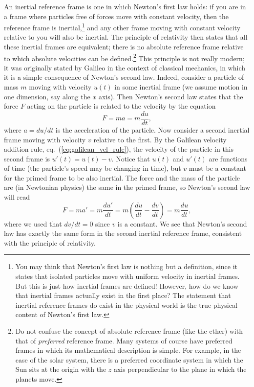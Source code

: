 An inertial reference frame is one in which Newton's first law holds: if you are in a frame where particles free of forces move with constant velocity, then the reference frame is inertial,\footnote{You may think that Newton's first law is nothing but a definition, since it states that isolated particles move with uniform velocity in inertial frames. But this is just how inertial frames are defined! However, how do we know that inertial frames actually exist in the first place? The statement that inertial reference frames do exist in the physical world is the true physical content of Newton's first law.} and any other frame moving with constant velocity relative to you will also be inertial. The principle of relativity then states that all these inertial frames are equivalent; there is no absolute reference frame relative to which absolute velocities can be defined.\footnote{Do not confuse the concept of absolute reference frame (like the ether) with that of {\it preferred} reference frame. Many systems of 
course have preferred frames in which its mathematical description is simple. For example, in the case of the solar system, there is a preferred coordinate system in which the Sun sits at the origin with the $z$ axis perpendicular to the plane in which the planets move.} This principle is not really modern; it was originally stated by Galileo in the context of classical mechanics, in which it is a simple consequence of Newton's second law. Indeed, consider a particle of mass $m$ moving with velocity $u(t)$ in some inertial frame (we assume motion in one dimension, say along the $x$ axis). Then Newton's second law states that the force $F$ acting on the particle is related to the velocity by the equation
\begin{equation}
F=ma=m\frac{du}{dt},
\end{equation}
where $a=du/dt$ is the acceleration of the particle. Now consider a second inertial frame moving with velocity $v$ relative to the first. By the Galilean velocity addition rule, eq.\ (\ref{eq:galilean_vel_rule}), the velocity of the particle in this second frame is $u'(t)=u(t)-v$. Notice that $u(t)$ and $u'(t)$ are functions of time (the particle's speed may be changing in time), but $v$ must be a constant for the primed frame to be also inertial. The force and the mass of the particle are (in Newtonian physics) the same in the primed frame, so Newton's second law will read
\begin{equation}
F=ma'=m\frac{du'}{dt}=m\left(\frac{du}{dt}-\frac{dv}{dt}\right)=m\frac{du}{dt},
\end{equation}
where we used that $dv/dt=0$ since $v$ is a constant. We see that Newton's second law has exactly the same form in the second inertial reference frame, consistent with the principle of relativity.

